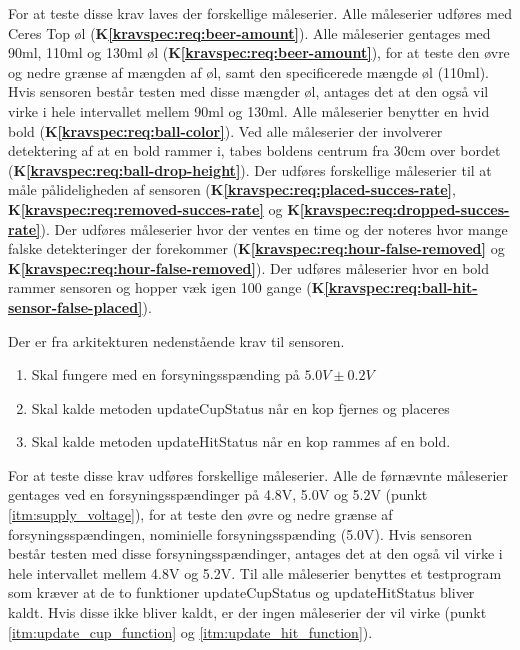 \documentclass[Modultest/Modultest_main.tex]{subfiles}
\begin{document}
For at teste disse krav laves der forskellige måleserier. Alle måleserier udføres med Ceres Top øl (\textbf{K\ref{kravspec:req:beer-amount}}). Alle måleserier gentages med 90ml, 110ml og 130ml øl (\textbf{K\ref{kravspec:req:beer-amount}}), for at teste den øvre og nedre grænse af mængden af øl, samt den specificerede mængde øl (110ml). Hvis sensoren består testen med disse mængder øl, antages det at den også vil virke i hele intervallet mellem 90ml og 130ml. Alle måleserier benytter en hvid bold (\textbf{K\ref{kravspec:req:ball-color}}). Ved alle måleserier der involverer detektering af at en bold rammer i, tabes boldens centrum fra 30cm over bordet (\textbf{K\ref{kravspec:req:ball-drop-height}}). Der udføres forskellige måleserier til at måle pålideligheden af sensoren (\textbf{K\ref{kravspec:req:placed-succes-rate}}, \textbf{K\ref{kravspec:req:removed-succes-rate}} og \textbf{K\ref{kravspec:req:dropped-succes-rate}}). Der udføres måleserier hvor der ventes en time og der noteres hvor mange falske detekteringer der forekommer (\textbf{K\ref{kravspec:req:hour-false-removed}} og \textbf{K\ref{kravspec:req:hour-false-removed}}). Der udføres måleserier hvor en bold rammer sensoren og hopper væk igen 100 gange (\textbf{K\ref{kravspec:req:ball-hit-sensor-false-placed}}).

Der er fra arkitekturen nedenstående krav til sensoren.
\begin{enumerate}
    \item Skal fungere med en forsyningsspænding på $5.0\si{V} \pm 0.2\si{V}$ \label{itm:supply_voltage}
    \item Skal kalde metoden updateCupStatus når en kop fjernes og placeres \label{itm:update_cup_function}
    \item Skal kalde metoden updateHitStatus når en kop rammes af en bold. \label{itm:update_hit_function}
\end{enumerate}

For at teste disse krav udføres forskellige måleserier. Alle de førnævnte måleserier gentages ved en forsyningsspændinger på 4.8V, 5.0V og 5.2V (punkt \ref{itm:supply_voltage}), for at teste den øvre og nedre grænse af forsyningsspændingen, nominielle forsyningsspænding (5.0V). Hvis sensoren består testen med disse forsyningsspændinger, antages det at den også vil virke i hele intervallet mellem 4.8V og 5.2V. Til alle måleserier benyttes et testprogram som kræver at de to funktioner updateCupStatus og updateHitStatus bliver kaldt. Hvis disse ikke bliver kaldt, er der ingen måleserier der vil virke (punkt \ref{itm:update_cup_function} og \ref{itm:update_hit_function}).
\end{document}
